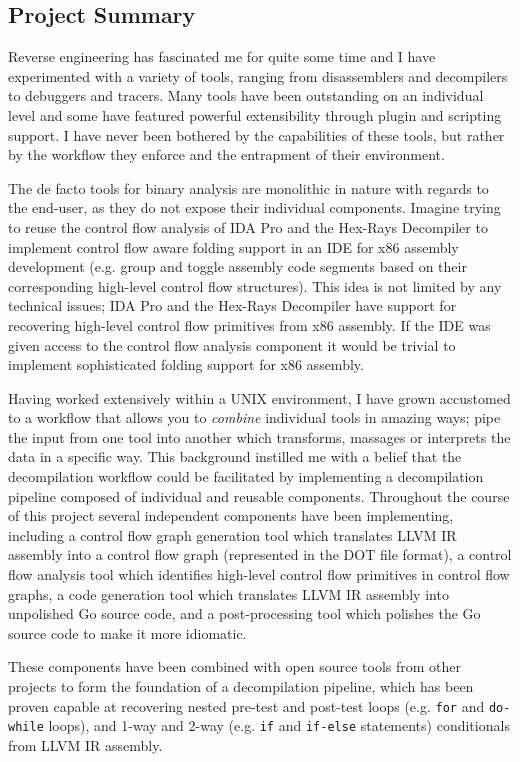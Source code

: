 
\subsection{Project Summary}


Reverse engineering has fascinated me for quite some time and I have experimented with a variety of tools, ranging from disassemblers and decompilers to debuggers and tracers. Many tools have been outstanding on an individual level and some have featured powerful extensibility through plugin and scripting support. I have never been bothered by the capabilities of these tools, but rather by the workflow they enforce and the entrapment of their environment.

The de facto tools for binary analysis are monolithic in nature with regards to the end-user, as they do not expose their individual components. Imagine trying to reuse the control flow analysis of IDA Pro and the Hex-Rays Decompiler to implement control flow aware folding support in an IDE for x86 assembly development (e.g. group and toggle assembly code segments based on their corresponding high-level control flow structures). This idea is not limited by any technical issues; IDA Pro and the Hex-Rays Decompiler have support for recovering high-level control flow primitives from x86 assembly. If the IDE was given access to the control flow analysis component it would be trivial to implement sophisticated folding support for x86 assembly.

Having worked extensively within a UNIX environment, I have grown accustomed to a workflow that allows you to \textit{combine} individual tools in amazing ways; pipe the input from one tool into another which transforms, massages or interprets the data in a specific way. This background instilled me with a belief that the decompilation workflow could be facilitated by implementing a decompilation pipeline composed of individual and reusable components. Throughout the course of this project several independent components have been implementing, including a control flow graph generation tool which translates LLVM IR assembly into a control flow graph (represented in the DOT file format), a control flow analysis tool which identifies high-level control flow primitives in control flow graphs, a code generation tool which translates LLVM IR assembly into unpolished Go source code, and a post-processing tool which polishes the Go source code to make it more idiomatic.

These components have been combined with open source tools from other projects to form the foundation of a decompilation pipeline, which has been proven capable at recovering nested pre-test and post-test loops (e.g. \texttt{for} and \texttt{do-while} loops), and 1-way and 2-way (e.g. \texttt{if} and \texttt{if-else} statements) conditionals from LLVM IR assembly.
